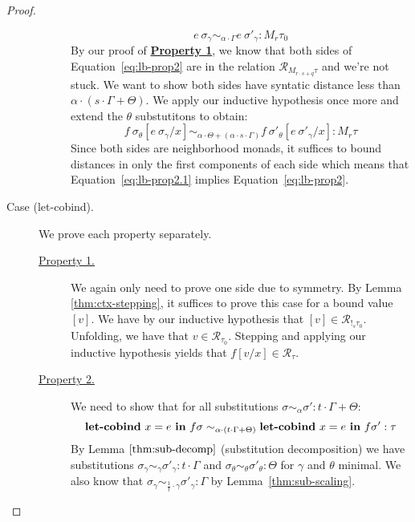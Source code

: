 \begin{proof}
\begin{description}
\begin{description}
          $$
          e~\sigma_{\gamma} \sim_{\alpha \cdot \Gamma}
          e~\sigma'_{\gamma} : M_r \tau_0
          $$
          By our proof of \textbf{\underline{Property 1}}, we know that both
          sides of Equation~\ref{eq:lb-prop2} are in the relation
          $\mathcal{R}_{M_{r \cdot s + q} \tau}$ and we're not stuck. We want to
          show both sides have syntatic distance less than $\alpha \cdot (s
          \cdot \Gamma + \Theta)$. 
          We apply our inductive hypothesis once more and extend the
          $\theta$ substutitons to obtain:
          \begin{equation}
            \label{eq:lb-prop2.1}
          f~\sigma_{\theta}[e~\sigma_{\gamma}/x] 
          \sim_{\alpha \cdot \Theta + (\alpha \cdot s \cdot \Gamma)} 
          f~\sigma'_{\theta}[e~\sigma'_{\gamma}/x] : M_{r} \tau
          \end{equation}
          Since both sides are neighborhood monads, it suffices to bound
          distances in only the first components of each side which means that
          Equation~\ref{eq:lb-prop2.1} implies Equation~\ref{eq:lb-prop2}.
      \end{description}
    \item[Case (let-cobind).] 
      We prove each property separately.
      \begin{description}
        \item[\underline{Property 1.}]
          We again only need to prove one side due to symmetry.
          By Lemma \ref{thm:ctx-stepping}, it suffices to prove this case for a
          bound value $[v]$. 
          We have by our inductive hypothesis that $[v] \in \mathcal{R}_{!_s \tau_0}$.
          Unfolding, we have that $v \in \mathcal{R}_{\tau_0}$.
          Stepping and applying our inductive hypothesis yields that $f[v/x] \in
          \mathcal{R}_{\tau}$.
        \item[\underline{Property 2.}]
          We need to show that for all substitutions $\sigma \sim_{\alpha}
          \sigma' : t \cdot \Gamma + \Theta$:
          $$\textbf{let-cobind}~x = e \ \textbf{in} \ f \sigma \sim_{\alpha \cdot (t
          \cdot \Gamma + \Theta)} \textbf{let-cobind}~x = e \ \textbf{in} \ f \sigma' :
          \tau$$
          By Lemma $\ref{thm:sub-decomp}$ (substitution decomposition) we have
          substitutions 
          $\sigma_{\gamma} \sim_{\gamma} \sigma'_{\gamma} : t \cdot \Gamma$
          and $\sigma_{\theta} \sim_{\theta} \sigma'_{\theta} : \Theta$ for
          $\gamma$ and $\theta$ minimal. 
          We also know that 
          $\sigma_{\gamma} \sim_{\frac{1}{t} \cdot \gamma} \sigma'_{\gamma} : \Gamma$ by
          Lemma~\ref{thm:sub-scaling}.


\end{description}
\end{description}
\end{proof}
